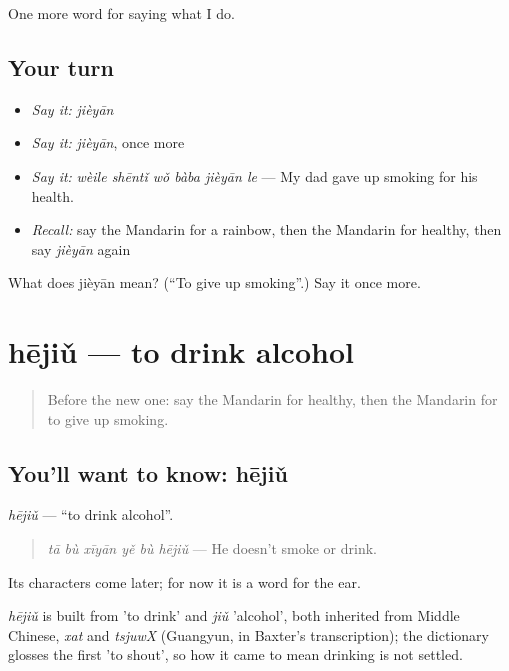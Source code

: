 \begin{grammarlens}[title={What you've built}]
One more word for saying what I do.
\end{grammarlens}

\subsection*{Your turn}
\begin{itemize}
\raggedright
  \item \emph{Say it:} \emph{jièyān}
  \item \emph{Say it:} \emph{jièyān}, once more
  \item \emph{Say it:} \emph{wèile shēntǐ wǒ bàba jièyān le} — My dad gave up smoking for his health.
  \item \emph{Recall:} say the Mandarin for a rainbow, then the Mandarin for healthy, then say \emph{jièyān} again
\end{itemize}

\begin{tcolorbox}[breakable,colback=teal!4,colframe=teal!35!black,title={Before you move on}]
What does jièyān mean? (\textquotedblleft{}To give up smoking\textquotedblright{}.) Say it once more.
\end{tcolorbox}
\section[hējiǔ]{hējiǔ — to drink alcohol}

\label{lesson:ZH-C239-hejiu}



\begin{quote}
Before the new one: say the Mandarin for healthy, then the Mandarin for to give up smoking.
\end{quote}

\subsection*{You'll want to know: hējiǔ}
\emph{hējiǔ} — \textquotedblleft{}to drink alcohol\textquotedblright{}.

\begin{quote}
\emph{tā bù xīyān yě bù hējiǔ} — He doesn't smoke or drink.
\end{quote}

Its characters come later; for now it is a word for the ear.

\begin{cousinweb}
\emph{hējiǔ} is built from  'to drink' and \emph{jiǔ} 'alcohol', both inherited from Middle Chinese, \emph{xat} and \emph{tsjuwX} (Guangyun, in Baxter's transcription); the dictionary glosses the first 'to shout', so how it came to mean drinking is not settled.
\end{cousinweb}

